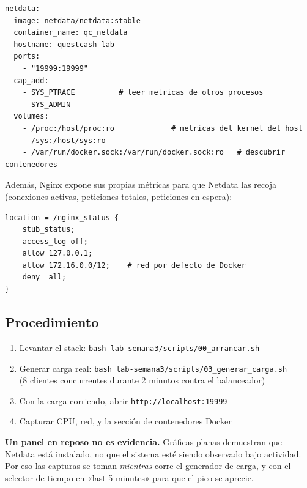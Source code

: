 \documentclass[11pt,letterpaper]{article}
\begin{document}
\begin{lstlisting}[style=conf,language=yamlqc,caption={\texttt{docker-compose.lab.yml} — servicio de monitoreo.}]
netdata:
  image: netdata/netdata:stable
  container_name: qc_netdata
  hostname: questcash-lab
  ports:
    - "19999:19999"
  cap_add:
    - SYS_PTRACE          # leer metricas de otros procesos
    - SYS_ADMIN
  volumes:
    - /proc:/host/proc:ro             # metricas del kernel del host
    - /sys:/host/sys:ro
    - /var/run/docker.sock:/var/run/docker.sock:ro   # descubrir contenedores
\end{lstlisting}

Además, Nginx expone sus propias métricas para que Netdata las recoja
(conexiones activas, peticiones totales, peticiones en espera):

\begin{lstlisting}[style=conf,language=nginxconf,caption={\texttt{nginx.conf} — endpoint de métricas restringido a la red interna.}]
location = /nginx_status {
    stub_status;
    access_log off;
    allow 127.0.0.1;
    allow 172.16.0.0/12;    # red por defecto de Docker
    deny  all;
}
\end{lstlisting}

\subsection{Procedimiento}

\begin{enumerate}[leftmargin=1.4em,itemsep=3pt]
  \item Levantar el stack: \texttt{bash lab-semana3/scripts/00\_arrancar.sh}
  \item Generar carga real: \texttt{bash lab-semana3/scripts/03\_generar\_carga.sh}\\
        (8 clientes concurrentes durante 2 minutos contra el balanceador)
  \item Con la carga corriendo, abrir \texttt{http://localhost:19999}
  \item Capturar CPU, red, y la sección de contenedores Docker
\end{enumerate}

\begin{alerta}
\textbf{Un panel en reposo no es evidencia.} Gráficas planas demuestran que
Netdata está instalado, no que el sistema esté siendo observado bajo actividad.
Por eso las capturas se toman \emph{mientras} corre el generador de carga, y con
el selector de tiempo en «last 5 minutes» para que el pico se aprecie.
\end{alerta}
\end{document}
